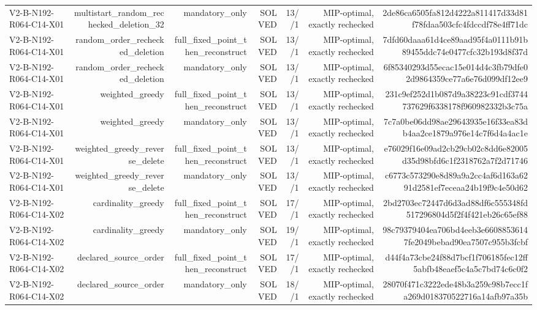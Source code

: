 {\begin{longtable}{lrrrrrr}
V2-B-N192-R064-C14-X01 & multistart\_random\_rechecked\_deletion\_32 & mandatory\_only & SOLVED & 13//1 & MIP-optimal, exactly rechecked & 2de86ca6505fa812d4222a811417d33d81f78fdaa503cfc4fdccdf78e4ff71dc \\
V2-B-N192-R064-C14-X01 & random\_order\_rechecked\_deletion & full\_fixed\_point\_then\_reconstruct & SOLVED & 13//1 & MIP-optimal, exactly rechecked & 7dfd60daaa61d4ce89aad95f4a0111b91b89455ddc74e0477cfc32b193d8f37d \\
V2-B-N192-R064-C14-X01 & random\_order\_rechecked\_deletion & mandatory\_only & SOLVED & 13//1 & MIP-optimal, exactly rechecked & 6f85340293d55ecac15e014d4c3fb79dfe02d9864359ce77a6e76d099df12ee9 \\
V2-B-N192-R064-C14-X01 & weighted\_greedy & full\_fixed\_point\_then\_reconstruct & SOLVED & 13//1 & MIP-optimal, exactly rechecked & 231c9ef252d1b087d9a38223c91cdf3744737629f6338178f960982332b3c75a \\
V2-B-N192-R064-C14-X01 & weighted\_greedy & mandatory\_only & SOLVED & 13//1 & MIP-optimal, exactly rechecked & 7c7a0be06dd98ae29643935e16f33ea83db4aa2ce1879a976e14c7f6d4a4ac1e \\
V2-B-N192-R064-C14-X01 & weighted\_greedy\_reverse\_delete & full\_fixed\_point\_then\_reconstruct & SOLVED & 13//1 & MIP-optimal, exactly rechecked & e76029f16e09ad2cb29cb02c8dd6e82005d35d98bfd6c1f2318762a7f2d71746 \\
V2-B-N192-R064-C14-X01 & weighted\_greedy\_reverse\_delete & mandatory\_only & SOLVED & 13//1 & MIP-optimal, exactly rechecked & c6773c573290e8d89a9a2cc4af6d163a6291d2581ef7eceaa24b19f9c4e50d62 \\
V2-B-N192-R064-C14-X02 & cardinality\_greedy & full\_fixed\_point\_then\_reconstruct & SOLVED & 17//1 & MIP-optimal, exactly rechecked & 2bd2703ec72447d6d3ad88df6c555348fd517296804d5f2f4f421eb26c65ef88 \\
V2-B-N192-R064-C14-X02 & cardinality\_greedy & mandatory\_only & SOLVED & 19//1 & MIP-optimal, exactly rechecked & 98c79379404ea706bd4eeb3e66088536147fe2049bebad90ea7507c955b3fcbf \\
V2-B-N192-R064-C14-X02 & declared\_source\_order & full\_fixed\_point\_then\_reconstruct & SOLVED & 17//1 & MIP-optimal, exactly rechecked & d44f4a73cbe24f88d7bcf1f706185fec12ff5abfb48eaef5c4a5c7bd74c6c0f2 \\
V2-B-N192-R064-C14-X02 & declared\_source\_order & mandatory\_only & SOLVED & 18//1 & MIP-optimal, exactly rechecked & 28070f471c3222ede48b3a259c98b7ecc1fa269d018370522716a14afb97a35b \\

\end{longtable}}
